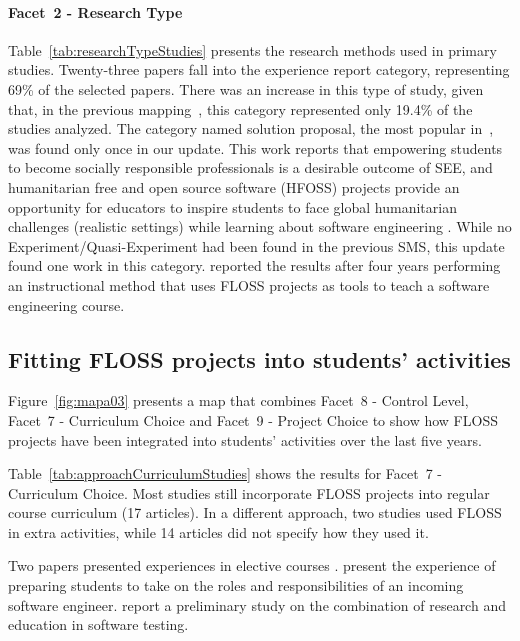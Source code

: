 \paragraph{Facet~2 - Research Type}
Table~\ref{tab:researchTypeStudies} presents the research methods used in primary studies.
Twenty-three papers fall into the experience report category, representing 69\% of the selected papers. 
There was an increase in this type of study, given that, in the previous mapping~\cite{2015:CSE:nascimento}, 
this category represented only 19.4\% of the studies analyzed. 
The category named solution proposal, the most popular
in~\cite{2015:CSE:nascimento}, was found only once in our update. 
This work reports that empowering students to become socially responsible professionals is a desirable outcome of SEE, 
and humanitarian free and open source software (HFOSS) projects provide an opportunity for educators to inspire students to face global humanitarian challenges (realistic settings) while learning about software engineering \cite{id1097}. 
While no Experiment/Quasi-Experiment had been found in the previous SMS, 
this update found one work \cite{id5676} in this category. 
\citeauthor{id5676} reported the results after four years performing an instructional method that uses FLOSS projects as tools to teach a software engineering course.

\subsection{Fitting FLOSS projects into students’ activities}

Figure~\ref{fig:mapa03} presents a map that combines 
Facet~8 - Control Level, Facet~7 - Curriculum Choice 
and Facet~9 - Project Choice to show
how FLOSS projects have been integrated into students' activities over the last five years. 



Table~\ref{tab:approachCurriculumStudies} shows the results 
for Facet~7 - Curriculum Choice. 
Most studies still incorporate FLOSS projects into regular course curriculum (17 articles). In a different approach, two studies used FLOSS in extra activities, while 14 articles did not specify how they used it.

Two papers presented experiences in elective courses \citep{id0093, id5353}. \citeauthor{id0093} present the experience of preparing students to take on the roles and responsibilities of an incoming software engineer. 
\citeauthor{id5353} report a preliminary study on the combination 
of research and education in software testing. 

